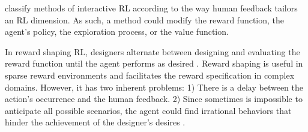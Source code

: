 \documentclass[twoside,11pt]{article}
\begin{document}

\cite{Arzate:2020:SurveyInteractiveRL} classify methods of interactive RL according to the way human feedback tailors an RL dimension. As such, a method could modify the reward function, the agent's policy, the exploration process, or the value function. 

In reward shaping RL, designers alternate between designing and evaluating the reward function until the agent performs as desired \citep{ng:99}. Reward shaping is useful in sparse reward environments and facilitates the reward specification in complex domains. However, it has two inherent problems: 1) There is a delay between the action's occurrence and the human feedback. 2) Since sometimes is impossible to anticipate all possible scenarios, the agent could find irrational behaviors that hinder the achievement of the designer's desires \citep{Arzate:2020:SurveyInteractiveRL}. 
\end{document}
